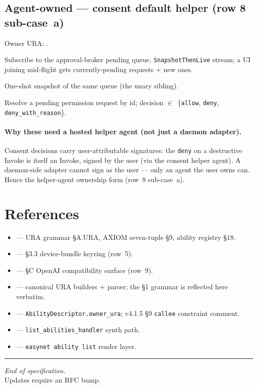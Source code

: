 \documentclass[10pt,a4paper]{article}
\newcommand{\code}[1]{\texttt{\small #1}}
\begin{document}
\subsection{Agent-owned --- consent default helper (row 8 sub-case~a)}

Owner URA: .

\begin{description}[leftmargin=1.4em,style=nextline,itemsep=0.15em]
  \item[\codew{consent.subscribe}] Subscribe to the
  approval-broker pending queue. \code{SnapshotThenLive} stream;
  a UI joining mid-flight gets currently-pending requests + new
  ones.
  \item[\codew{consent.list_pending}] One-shot snapshot of the
  same queue (the unary sibling).
  \item[\codew{consent.decide}] Resolve a pending permission
  request by id; decision $\in$~\{\code{allow}, \code{deny},
  \code{deny\_with\_reason}\}.
\end{description}

\paragraph{Why these need a hosted helper agent (not just a daemon adapter).}
Consent decisions carry user-attributable signatures: the \code{deny}
on a destructive Invoke is itself an Invoke, signed by the user (via
the consent helper agent). A daemon-side adapter cannot sign as the
user --- only an agent the user owns can. Hence the helper-agent
ownership form (row~8 sub-case~a).

\section*{References}

\begin{itemize}[leftmargin=1.6em,itemsep=0.1em]
  \item {} --- URA grammar §A.URA, AXIOM seven-tuple §9, ability registry §18.
  \item {} --- §3.3 device-bundle keyring (row~5).
  \item {} --- §C OpenAI compatibility surface (row~9).
  \item {} --- canonical URA builders + parser; the §1 grammar is reflected here verbatim.
  \item {} --- \code{AbilityDescriptor.owner\_ura}; v4.1.5 §9 \code{callee} constraint comment.
  \item {} --- \code{list\_abilities\_handler} synth path.
  \item {} --- \code{easynet ability list} render layer.
\end{itemize}

\vspace{1em}
\hrule
\vspace{0.4em}
\begin{flushright}\small
  \emph{End of specification.}\\
  Updates require an RFC bump.
\end{flushright}
\end{document}
